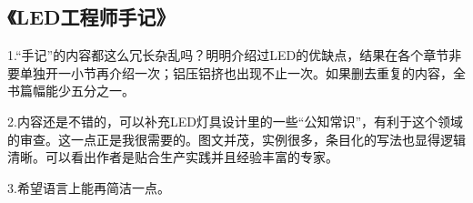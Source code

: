 \subsection{《LED工程师手记》
}
1.“手记”的内容都这么冗长杂乱吗？明明介绍过LED的优缺点，结果在各个章节非要单独开一小节再介绍一次；铝压铝挤也出现不止一次。如果删去重复的内容，全书篇幅能少五分之一。

2.内容还是不错的，可以补充LED灯具设计里的一些“公知常识”，有利于这个领域的审查。这一点正是我很需要的。图文并茂，实例很多，条目化的写法也显得逻辑清晰。可以看出作者是贴合生产实践并且经验丰富的专家。

3.希望语言上能再简洁一点。